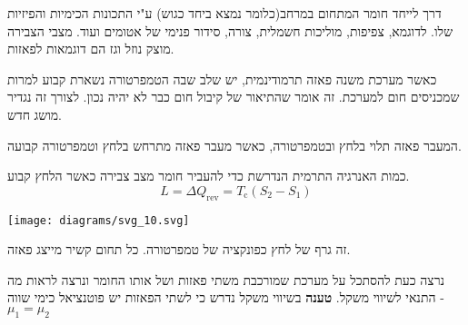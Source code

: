 \documentclass{tstextbook}
\begin{document}
\begin{definition}
דרך לייחד חומר המתחום במרחב(כלומר נמצא ביחד כגוש) ע"י התכונות הכימיות והפיזיות שלו. לדוגמא, צפיפות, מוליכות חשמלית, צורה, סידור פנימי של אטומים ועוד. מצבי הצבירה מוצק נוזל וגז הם דוגמאות לפאזות.

\end{definition}
כאשר מערכת משנה פאזה תרמודינמית, יש שלב שבה הטמפרטורה נשארת קבוע למרות שמכניסים חום למערכת. זה אומר שהתיאור של קיבול חום כבר לא יהיה נכון. לצורך זה נגדיר מושג חדש.

\begin{proposition}
המעבר פאזה תלוי בלחץ ובטמפרטורה, כאשר מעבר פאזה מתרחש בלחץ וטמפרטורה קבועה.

\end{proposition}
\begin{definition}
כמות האנרגיה התרמית הנדרשת כדי להעביר חומר מצב צבירה כאשר הלחץ קבוע.
$${L}=\Delta Q_{\mathrm{rev}}=T_{\mathrm{c}}(S_{2}-S_{1})$$

\end{definition}
\texttt{[image: diagrams/svg\_10.svg]}
\begin{definition}
זה גרף של לחץ כפונקציה של טמפרטורה. כל תחום קשיר מייצג פאזה.

\end{definition}
נרצה כעת להסתכל על מערכת שמורכבת משתי פאזות ושל אותו החומר ונרצה לראות מה התנאי לשיווי משקל.
\textbf{טענה}
בשיווי משקל נדרש כי לשתי הפאזות יש פוטנציאל כימי שווה - \(\mu_{1}=\mu_{2}\)
\end{document}
